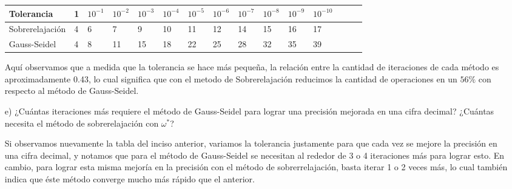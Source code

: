 \begin{enumerate}
\begin{solution}
\begin{center}
\begin{tabular}{|l|l|l|l|l|l|l|l|l|l|l|l|l|l|c|}
Tolerancia & 1 & $10^{-1}$ & $10^{-2}$ & $10^{-3}$ & $10^{-4}$ & $10^{-5}$ & $10^{-6}$ & $10^{-7}$ & $10^{-8}$ & $10^{-9}$ & $10^{-10}$ \\ \hline
Sobrerelajación & 4 & 6 & 7 & 9 & 10 & 11 & 12 & 14 & 15 & 16 & 17 \\ \hline
Gauss-Seidel & 4 & 8 & 11 & 15 & 18 & 22 & 25 & 28 & 32 & 35 & 39 \\ \hline      
\end{tabular}
\end{center}
Aquí observamos que a medida que la tolerancia se hace más pequeña, la relación entre la cantidad de iteraciones de cada método es aproximadamente 0.43, lo cual significa que con el metodo de Sobrerelajación reducimos la cantidad de operaciones en un $56\%$ con respecto al método de Gauss-Seidel.
    \end{solution}
    \item[e)] ¿Cuántas iteraciones más requiere el método de Gauss-Seidel para lograr una precisión mejorada en una cifra decimal? ¿Cuántas necesita el método de sobrerelajación con $\omega^*$?
    \begin{solution}
        Si observamos nuevamente la tabla del inciso anterior, variamos la tolerancia justamente para que cada vez se mejore la precisión en una cifra decimal, y notamos que para el método de Gauss-Seidel se necesitan al rededor de 3 o 4 iteraciones más para lograr esto. En cambio, para lograr esta misma mejoría en la precisión con el método de sobrerrelajación, basta iterar 1 o 2 veces más, lo cual también indica que éste método converge mucho más rápido que el anterior.
    \end{solution}
\end{enumerate}
